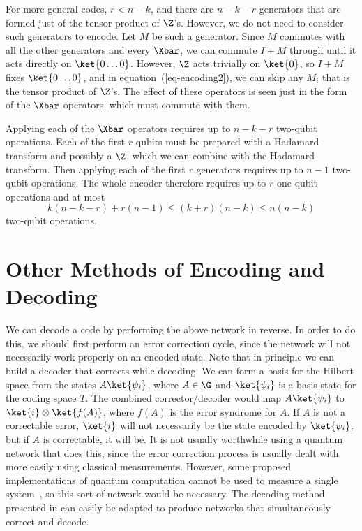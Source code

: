 For more general codes, $r<n-k$, and there are $n-k-r$ generators that are
formed just of the tensor product of $\Z$'s.  However, we do not need to
consider such generators to encode.  Let $M$ be such a generator.  Since
$M$ commutes with all the other generators and every $\Xbar$, we can
commute $I + M$ through until it acts directly on $\ket{0 \ldots 0}$.
However, $\Z$ acts trivially on $\ket{0}$, so $I+M$ fixes $\ket{0 \ldots 0}$,
and in equation~(\ref{eq-encoding2}), we can skip any $M_i$ that is the tensor
product of $\Z$'s.  The effect of these operators is seen just in
the form of the $\Xbar$ operators, which must commute with them.

Applying each of the $\Xbar$ operators requires up to $n-k-r$ two-qubit
operations.  Each of the first $r$ qubits must be prepared with a Hadamard
transform and possibly a $\Z$, which we can combine with the Hadamard
transform.  Then applying each of the first $r$ generators requires up to
$n-1$ two-qubit operations.  The whole encoder therefore requires up to $r$
one-qubit operations and at most
\begin{equation}
	k(n-k-r) + r(n-1) \leq (k+r)(n-k) \leq n(n-k)
\end{equation}
two-qubit operations.

\section{Other Methods of Encoding and Decoding}

We can decode a code by performing the above network in reverse.  In
order to do this, we should first perform an error correction cycle, since
the network will not necessarily work properly on an encoded state.  Note
that in principle we can build a decoder that corrects while decoding.  We
can form a basis for the Hilbert space from the states $A \ket{\psi_i}$,
where $A \in \G$ and $\ket{\psi_i}$ is a basis state for the coding space
$T$.  The combined corrector/decoder would map $A \ket{\psi_i}$ to
$\ket{i} \otimes \ket{f(A)}$, where $f(A)$ is the error syndrome for $A$.
If $A$ is not a correctable error, $\ket{i}$ will not necessarily be the state
encoded by $\ket{\psi_i}$, but if $A$ is correctable, it will be.  It is not
usually worthwhile using a quantum network that does this, since the error
correction process is usually dealt with more easily using classical
measurements.  However, some proposed implementations of quantum computation
cannot be used to measure a single system~\cite{gershenfeld}, so this sort of
network would be necessary.  The decoding method presented in
\cite{divincenzo-decoder} can easily be adapted to produce networks that
simultaneously correct and decode.

